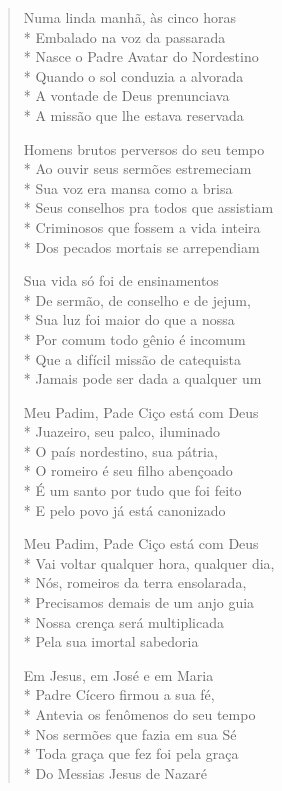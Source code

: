 \begin{verse}
Numa linda manhã, às cinco horas\\*
Embalado na voz da passarada\\*
Nasce o Padre Avatar do Nordestino\\*
Quando o sol conduzia a alvorada\\*
A vontade de Deus prenunciava\\*
A missão que lhe estava reservada

Homens brutos perversos do seu tempo\\*
Ao ouvir seus sermões estremeciam\\*
Sua voz era mansa como a brisa\\*
Seus conselhos pra todos que assistiam\\*
Criminosos que fossem a vida inteira\\*
Dos pecados mortais se arrependiam

Sua vida só foi de ensinamentos\\*
De sermão, de conselho e de jejum,\\*
Sua luz foi maior do que a nossa\\*
Por comum todo gênio é incomum\\*
Que a difícil missão de catequista\\*
Jamais pode ser dada a qualquer um

Meu Padim, Pade Ciço está com Deus\\*
Juazeiro, seu palco, iluminado\\*
O país nordestino, sua pátria,\\*
O romeiro é seu filho abençoado\\*
É um santo por tudo que foi feito\\*
E pelo povo já está canonizado

Meu Padim, Pade Ciço está com Deus\\*
Vai voltar qualquer hora, qualquer dia,\\*
Nós, romeiros da terra ensolarada,\\*
Precisamos demais de um anjo guia\\*
Nossa crença será multiplicada\\*
Pela sua imortal sabedoria

Em Jesus, em José e em Maria\\*
Padre Cícero firmou a sua fé,\\*
Antevia os fenômenos do seu tempo\\*
Nos sermões que fazia em sua Sé\\*
Toda graça que fez foi pela graça\\*
Do Messias Jesus de Nazaré


\end{verse}
